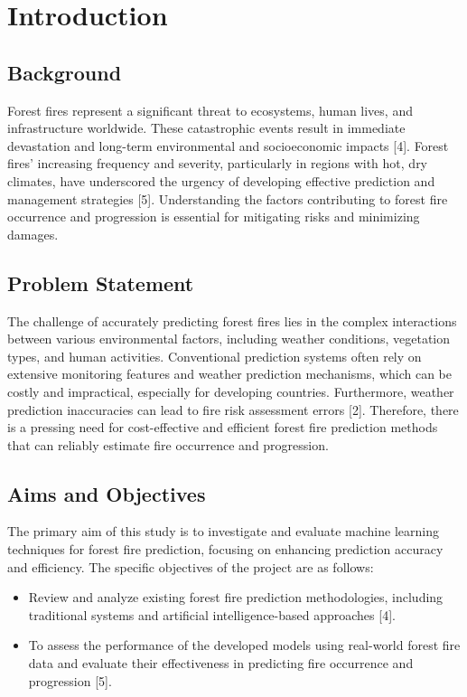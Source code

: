 \chapter{Introduction}
\label{ch:into} 



\section{Background}
Forest fires represent a significant threat to ecosystems, human lives, and infrastructure worldwide. These catastrophic events result in immediate devastation and long-term environmental and socioeconomic impacts [4]. Forest fires' increasing frequency and severity, particularly in regions with hot, dry climates, have underscored the urgency of developing effective prediction and management strategies [5]. Understanding the factors contributing to forest fire occurrence and progression is essential for mitigating risks and minimizing damages.


\section{Problem Statement}
The challenge of accurately predicting forest fires lies in the complex interactions between various environmental factors, including weather conditions, vegetation types, and human activities. Conventional prediction systems often rely on extensive monitoring features and weather prediction mechanisms, which can be costly and impractical, especially for developing countries. Furthermore, weather prediction inaccuracies can lead to fire risk assessment errors [2]. Therefore, there is a pressing need for cost-effective and efficient forest fire prediction methods that can reliably estimate fire occurrence and progression.


\section{Aims and Objectives}
The primary aim of this study is to investigate and evaluate machine learning techniques for forest fire prediction, focusing on enhancing prediction accuracy and efficiency. The specific objectives of the project are as follows:
\begin{itemize}
     
    \item Review and analyze existing forest fire prediction methodologies, including traditional systems and artificial intelligence-based approaches [4].
    \item To assess the performance of the developed models using real-world forest fire data and evaluate their effectiveness in predicting fire occurrence and progression [5].

\end{itemize}

